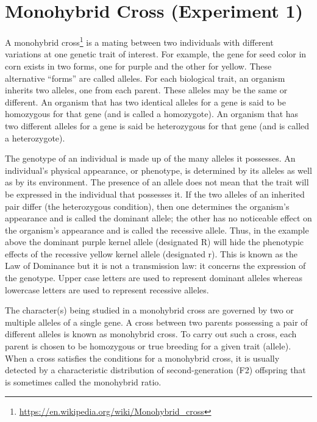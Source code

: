 \documentclass[]{book}
\let\rmarkdownfootnote\footnote%
\def\footnote{\protect\rmarkdownfootnote}
\renewcommand{\href}[2]{#2\footnote{\url{#1}}}
\begin{document}
\hypertarget{monohybrid-cross-experiment-1}{%
\section{Monohybrid Cross (Experiment 1)}\label{monohybrid-cross-experiment-1}}

A \href{https://en.wikipedia.org/wiki/Monohybrid_cross}{monohybrid cross} is a mating between two individuals with different variations at one genetic trait of interest. For example, the gene for seed color in corn exists in two forms, one for purple and the other for yellow. These alternative ``forms'' are called alleles. For each biological trait, an organism inherits two alleles, one from each parent. These alleles may be the same or different. An organism that has two identical alleles for a gene is said to be homozygous for that gene (and is called a homozygote). An organism that has two different alleles for a gene is said be heterozygous for that gene (and is called a heterozygote).

The genotype of an individual is made up of the many alleles it possesses. An individual's physical appearance, or phenotype, is determined by its alleles as well as by its environment. The presence of an allele does not mean that the trait will be expressed in the individual that possesses it. If the two alleles of an inherited pair differ (the heterozygous condition), then one determines the organism's appearance and is called the dominant allele; the other has no noticeable effect on the organism's appearance and is called the recessive allele. Thus, in the example above the dominant purple kernel allele (designated R) will hide the phenotypic effects of the recessive yellow kernel allele (designated r). This is known as the Law of Dominance but it is not a transmission law: it concerns the expression of the genotype. Upper case letters are used to represent dominant alleles whereas lowercase letters are used to represent recessive alleles.

The character(s) being studied in a monohybrid cross are governed by two or multiple alleles of a single gene. A cross between two parents possessing a pair of different alleles is known as monohybrid cross. To carry out such a cross, each parent is chosen to be homozygous or true breeding for a given trait (allele). When a cross satisfies the conditions for a monohybrid cross, it is usually detected by a characteristic distribution of second-generation (F2) offspring that is sometimes called the monohybrid ratio.
\end{document}

